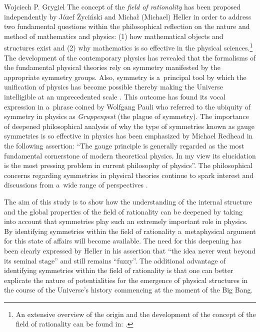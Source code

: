 \begin{artengenv}{Wojciech P. Grygiel}
\lettrine[loversize=0.13,lines=2,lraise=-0.03,nindent=0em,findent=0.2pt]%
{T}{}he concept of the \textit{field of rationality} has been proposed independently by Józef Życiński and Michał (Michael) Heller in order to address two fundamental questions within the philosophical reflection on the nature and method of mathematics and physics: (1) how mathematical objects and structures exist and (2) why mathematics is so effective in the physical sciences.\footnote{An extensive overview of the origin and the development of the concept of the field of rationality can be found in: 
\parencites[][]{pabjan_jozefa_2011}[][]{grygiel_critical_2022}. %
 } The development of the contemporary physics has revealed that the formalisms of the fundamental physical theories rely on symmetry manifested by the appropriate symmetry groups. Also, symmetry is a~principal tool by which the unification of physics has become possible thereby making the Universe intelligible at an unprecedented scale 
\parencite[e.g.,][]{gross_role_1996}. %
 This outcome has found its vocal expression in a~phrase coined by Wolfgang Pauli who referred to the ubiquity of symmetry in physics as \textit{Gruppenpest} (the plague of symmetry). The importance of deepened philosophical analysis of why the type of symmetries known as gauge symmetries is so effective in physics has been emphasized by Michael Redhead 
\parencite*[][p.138]{brading_interpretation_2003} %
 in the following assertion: ``The gauge principle is generally regarded as the most fundamental cornerstone of modern theoretical physics. In my view its elucidation is the most pressing problem in current philosophy of physics''. The philosophical concerns regarding symmetries in physical theories continue to spark interest and discussions from a~wide range of perspectives 
\parencite[e.g.,][]{dardashti_editorial_2021}.%




The aim of this study is to show how the understanding of the internal structure and the global properties of the field of rationality can be deepened by taking into account that symmetries play such an extremely important role in physics. By identifying symmetries within the field of rationality a~metaphysical argument for this state of affairs will become available. The need for this deepening has been clearly expressed by Heller 
\parencite*[][p.442]{heller_field_2014} %
 in his assertion that ``the idea never went beyond its seminal stage'' and still remains ``fuzzy''. The additional advantage of identifying symmetries within the field of rationality is that one can better explicate the nature of potentialities for the emergence of physical structures in the course of the Universe's history commencing at the moment of the Big Bang.




\end{artengenv}
